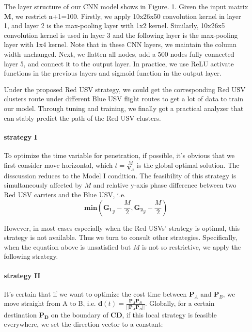 \documentclass{mcmthesis}
\begin{document}
The layer structure of our CNN model shows in Figure. 1. Given the input matrix $\mathbf{M}$, we restrict n+1=100. Firstly, we apply 10x26x50 convolution kernel in layer 1, and layer 2 is the max-pooling layer with 1x2 kernel. Similarly, 10x26x5 convolution kernel is used in layer 3 and the following layer is the max-pooling layer with 1x4 kernel. Note that in these CNN layers, we maintain the column width unchanged. Next, we flatten all nodes, add a 500-nodes fully connected layer 5, and connect it to the output layer. In practice, we use ReLU activate functions in the previous layers and sigmoid function in the output layer. \par

Under the proposed Red USV strategy, we could get the corresponding Red USV clusters route under different Blue USV flight routes to get a lot of data to train our model. Through tuning and training, we finally got a practical analyzer that can stably predict the path of the Red USV clusters. \par

\paragraph{strategy I}

To optimize the time variable for penetration, if possible, it's obvious that we first consider move horizontal, which $t=\frac{M}{\mathbf{V}_{B}}$ is the global optimal solution. The disscussion reduces to the Model I condition. The feasibility of this strategy is simultaneously affected by $M$ and relative y-axis phase difference between two Red USV carriers and the Blue USV, i.e. 
\begin{equation}
\mathbf{min}(\mathbf{G_1}_y - \frac{M}{2}, \mathbf{G_2}_y - \frac{M}{2})
\end{equation}

However, in most cases especially when the Red USVs' strategy is optimal, this strategy is not available. Thus we turn to consult other strategies. Specifically, when the equation above is unsatisfied but $M$ is not so restrictive, we apply the following strategy.

\paragraph{strategy II}

It's certain that if we want to optimize the cost time between $\mathbf{P}_A$ and $\mathbf{P}_B$, we move straight from A to B, i.e. $\mathbf{d}(t)=\frac{\mathbf{P}_A \mathbf{P}_B}{\vert \vert \mathbf{P}_A \mathbf{P}_B \vert \vert}$. Globally, for a certain destination $\mathbf{P_D}$ on the boundary of $\mathbf{CD}$, if this local strategy is feasible everywhere, we set the direction vector to a constant:
\end{document}
